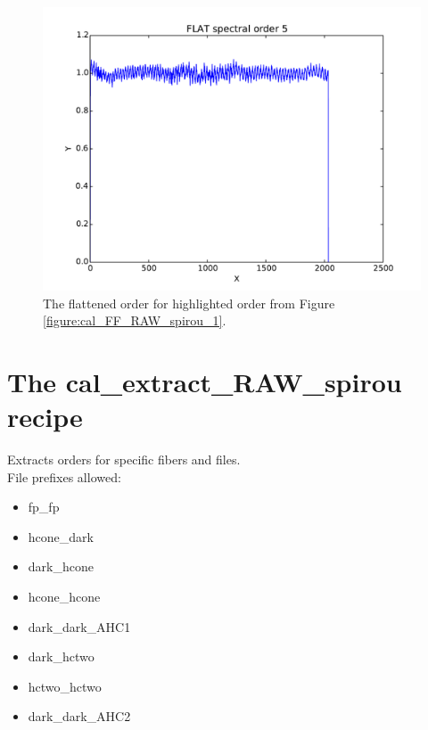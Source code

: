 \begin{figure}
\begin{center}
\includegraphics[width=.8\textwidth]{figures/cal_FF_RAW_spirou_3.pdf}
\caption{The flattened order for highlighted order from Figure \protect\ref{figure:cal_FF_RAW_spirou_1}. \label{figure:cal_FF_RAW_spirou_3}}
\end{center}
\end{figure}

\clearpage
\newpage
\section{The cal\_extract\_RAW\_spirou recipe}
\label{section:cal_extract_RAW_spirou}

Extracts orders for specific fibers and files. \\

\noindent File prefixes allowed:
\begin{itemize}
	\item fp\_fp
	\item hcone\_dark
	\item dark\_hcone
	\item hcone\_hcone
	\item dark\_dark\_AHC1
	\item dark\_hctwo
	\item hctwo\_hctwo
	\item dark\_dark\_AHC2
\end{itemize}


